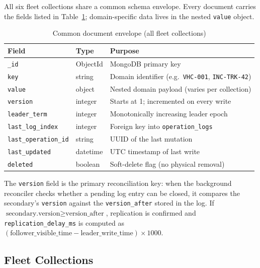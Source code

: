\documentclass[12pt,a4paper]{article}
\newcommand{\code}[1]{\texttt{\small #1}}
\begin{document}
All six fleet collections share a common schema envelope. Every document carries the
fields listed in Table~\ref{tab:envelope}; domain-specific data lives in the nested
\code{value} object.

\begin{table}[H]
  \centering
  \caption{Common document envelope (all fleet collections)}
  \label{tab:envelope}
  \small
  \begin{tabularx}{\textwidth}{llX}
    \toprule
    Field & Type & Purpose \\
    \midrule
    \code{\_id}               & ObjectId  & MongoDB primary key \\
    \code{key}                & string    & Domain identifier (e.g.\ \texttt{VHC-001}, \texttt{INC-TRK-42}) \\
    \code{value}              & object    & Nested domain payload (varies per collection) \\
    \code{version}            & integer   & Starts at 1; incremented on every write \\
    \code{leader\_term}       & integer   & Monotonically increasing leader epoch \\
    \code{last\_log\_index}   & integer   & Foreign key into \code{operation\_logs} \\
    \code{last\_operation\_id}& string    & UUID of the last mutation \\
    \code{last\_updated}      & datetime  & UTC timestamp of last write \\
    \code{deleted}            & boolean   & Soft-delete flag (no physical removal) \\
    \bottomrule
  \end{tabularx}
\end{table}

The \code{version} field is the primary reconciliation key: when the background
reconciler checks whether a pending log entry can be closed, it compares the secondary's
\code{version} against the \code{version\_after} stored in the log. If
$\text{secondary.version} \geq \text{version\_after}$, replication is confirmed and
\code{replication\_delay\_ms} is computed as
$(\text{follower\_visible\_time} - \text{leader\_write\_time}) \times 1000$.

\subsection{Fleet Collections}
\end{document}
